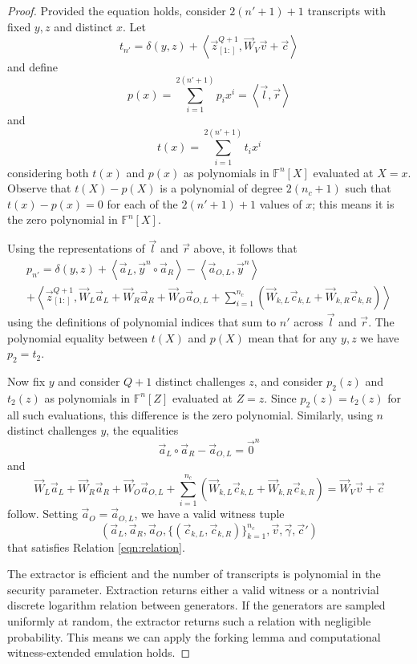 \documentclass{article}
\newcommand{\FF}{\mathbb{F}}
\newcommand{\mat}[1]{\vec{#1}}
\newcommand{\zq}{\vec{z}^{Q+1}_{[1:]}}
\begin{document}
\begin{proof}
	Provided the equation holds, consider $2(n' + 1) + 1$ transcripts with fixed $y, z$ and distinct $x$.
	Let
	$$t_{n'} = \delta(y, z) + \left\langle \zq, \mat{W}_V \vec{v} + \vec{c} \right\rangle$$
	and define
	$$p(x) = \sum_{i=1}^{2(n' + 1)} p_i x^i = \left\langle \vec{l}, \vec{r} \right\rangle$$
	and
	$$t(x) = \sum_{i=1}^{2(n' + 1)} t_i x^i$$
	considering both $t(x)$ and $p(x)$ as polynomials in $\FF^n[X]$ evaluated at $X = x$.
	Observe that $t(X) - p(X)$ is a polynomial of degree $2(n_c + 1)$ such that $t(x) - p(x) = 0$ for each of the $2(n' + 1) + 1$ values of $x$; this means it is the zero polynomial in $\FF^n[X]$.

	Using the representations of $\vec{l}$ and $\vec{r}$ above, it follows that
	\begin{multline*}
		p_{n'} = \delta(y, z) + \left\langle \vec{a}_L, \vec{y}^n \circ \vec{a}_R \right\rangle - \left\langle \vec{a}_{O,L}, \vec{y}^n \right\rangle \\
		+ \left\langle \zq, \mat{W}_L \vec{a}_L + \mat{W}_R \vec{a}_R + \mat{W}_O \vec{a}_{O,L} + \sum_{i=1}^{n_c} \left( \mat{W}_{k,L} \vec{c}_{k,L} + \mat{W}_{k,R} \vec{c}_{k,R} \right) \right\rangle
	\end{multline*}
	using the definitions of polynomial indices that sum to $n'$ across $\vec{l}$ and $\vec{r}$.
	The polynomial equality between $t(X)$ and $p(X)$ mean that for any $y, z$ we have $p_2 = t_2$.

	Now fix $y$ and consider $Q + 1$ distinct challenges $z$, and consider $p_2(z)$ and $t_2(z)$ as polynomials in $\FF^n[Z]$ evaluated at $Z = z$.
	Since $p_2(z) = t_2(z)$ for all such evaluations, this difference is the zero polynomial.
	Similarly, using $n$ distinct challenges $y$, the equalities
	$$\vec{a}_L \circ \vec{a}_R - \vec{a}_{O,L} = \vec{0}^n$$
	and
	$$\mat{W}_L \vec{a}_L + \mat{W}_R \vec{a}_R + \mat{W}_O \vec{a}_{O,L} + \sum_{i=1}^{n_c} \left( \mat{W}_{k,L} \vec{c}_{k,L} + \mat{W}_{k,R} \vec{c}_{k,R} \right) = \mat{W}_V \vec{v} + \vec{c}$$
	follow.
	Setting $\vec{a}_O = \vec{a}_{O,L}$, we have a valid witness tuple
	$$\left( \vec{a}_L, \vec{a}_R, \vec{a}_O, \{ (\vec{c}_{k,L}, \vec{c}_{k,R}) \}_{k=1}^{n_c}, \vec{v}, \vec{\gamma}, \vec{c}' \right)$$
	that satisfies Relation \ref{eqn:relation}.

	The extractor is efficient and the number of transcripts is polynomial in the security parameter.
	Extraction returns either a valid witness or a nontrivial discrete logarithm relation between generators.
	If the generators are sampled uniformly at random, the extractor returns such a relation with negligible probability.
	This means we can apply the forking lemma and computational witness-extended emulation holds.
\end{proof}
\end{document}
